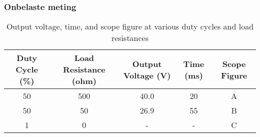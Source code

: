 \subsubsection{Onbelaste meting}
\begin{table}[h!]
\centering
\begin{tabular}{|c|c|c|c|c|}
\hline
\textbf{Duty Cycle (\%)} & \textbf{Load Resistance (ohm)} & \textbf{Output Voltage (V)} & \textbf{Time (ms)} & \textbf{Scope Figure} \\ \hline
50 & 500 & 40.0 & 20 & A \\ \hline
50 & 50 & 26.9 & 55 & B \\ \hline
1 & 0 & - & - & C \\ \hline
\end{tabular}
\caption{Output voltage, time, and scope figure at various duty cycles and load resistances}
\label{tab:duty_cycle_scope}
\end{table}

